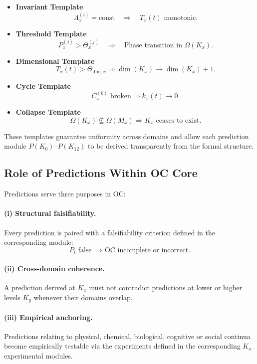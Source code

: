 \begin{itemize}
    \item \textbf{Invariant Template}
    \[
    A_x^{(i)} = \mathrm{const}
    \quad\Rightarrow\quad
    T_x(t) \text{ monotonic}.
    \]

    \item \textbf{Threshold Template}
    \[
    P_x^{(j)} > \Theta_x^{(j)}
    \quad\Rightarrow\quad
    \text{Phase transition in }\Omega(K_x).
    \]

    \item \textbf{Dimensional Template}
    \[
    T_x(t) > \Theta_{\mathrm{dim},x}
    \Rightarrow
    \dim(K_x)\to\dim(K_x)+1.
    \]

    \item \textbf{Cycle Template}
    \[
    C_x^{(k)} \text{ broken}
    \Rightarrow
    k_x(t)\to 0.
    \]

    \item \textbf{Collapse Template}
    \[
    \Omega(K_x)\not\subseteq\Omega(M_x)
    \Rightarrow
    K_x\text{ ceases to exist}.
    \]
\end{itemize}

These templates guarantee uniformity across domains  
and allow each prediction module $P(K_0)$–$P(K_{12})$  
to be derived transparently from the formal structure.

\subsection{Role of Predictions Within OC Core}

Predictions serve three purposes in OC:

\paragraph{(i) Structural falsifiability.}
Every prediction is paired with a falsifiability criterion  
defined in the corresponding module:
\[
P_i \text{ false } \Rightarrow \text{OC incomplete or incorrect}.
\]

\paragraph{(ii) Cross-domain coherence.}
A prediction derived at $K_x$ must not contradict predictions at  
lower or higher levels $K_y$ whenever their domains overlap.

\paragraph{(iii) Empirical anchoring.}
Predictions relating to physical, chemical, biological, cognitive or  
social continua become empirically testable via the experiments  
defined in the corresponding $K_x$ experimental modules.

